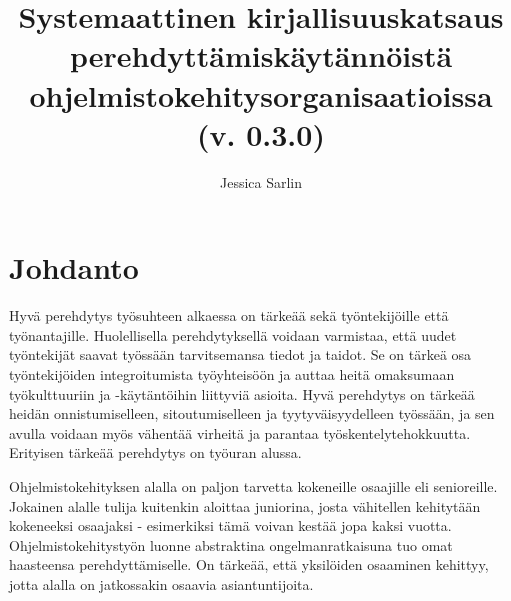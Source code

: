 \documentclass[utf8]{gradu3}
\begin{document}
\title{Systemaattinen kirjallisuuskatsaus perehdyttämiskäytännöistä ohjelmistokehitysorganisaatioissa (v. 0.3.0)}




\author{Jessica Sarlin}


\maketitle

\mainmatter

\chapter{Johdanto}



Hyvä perehdytys työsuhteen alkaessa on tärkeää sekä työntekijöille että työnantajille. Huolellisella perehdytyksellä voidaan varmistaa, että uudet työntekijät saavat työssään tarvitsemansa tiedot ja taidot. Se on tärkeä osa työntekijöiden integroitumista työyhteisöön ja auttaa heitä omaksumaan työkulttuuriin ja -käytäntöihin liittyviä asioita. Hyvä perehdytys on tärkeää heidän onnistumiselleen, sitoutumiselleen ja tyytyväisyydelleen työssään, ja sen avulla voidaan myös vähentää virheitä ja parantaa työskentelytehokkuutta. Erityisen tärkeää perehdytys on työuran alussa.

Ohjelmistokehityksen alalla on paljon tarvetta kokeneille osaajille eli senioreille. Jokainen alalle tulija kuitenkin aloittaa juniorina, josta vähitellen kehitytään kokeneeksi osaajaksi - esimerkiksi \textcite{bologa-lupu-2014} tämä voivan kestää jopa kaksi vuotta. Ohjelmistokehitystyön luonne abstraktina ongelmanratkaisuna tuo omat haasteensa perehdyttämiselle. On tärkeää, että yksilöiden osaaminen kehittyy, jotta alalla on jatkossakin osaavia asiantuntijoita.
\end{document}
